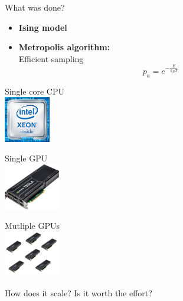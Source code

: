 \documentclass{beamer}
\begin{document}
\setcounter{framenumber}{0}

\begin{frame}{What was done?}
    \begin{itemize}
        \item \textbf{Ising model}
            \noindent \ising
        \item \textbf{Metropolis algorithm:}\\
            Efficient sampling
            \begin{equation*}
                p_a = e^{-\frac{E}{k_B T}}
            \end{equation*}
    \end{itemize} \pause
    \vspace{5mm}
    \begin{minipage}{0.2\paperwidth}
        Single core CPU\\
        \includegraphics[keepaspectratio=true, height=2cm]{images/intel_xeon.jpg}
    \end{minipage} \pause
    \hfill
    \begin{minipage}{0.2\paperwidth}
        Single GPU\\
        \includegraphics[keepaspectratio=true, height=2cm]{images/gpu_modified.png}
    \end{minipage} \pause
    \hfill
    \begin{minipage}{0.3\paperwidth}
        Mutliple GPUs\\
        \includegraphics[keepaspectratio=true, height=2cm]{images/multi_gpu.png}
    \end{minipage} \pause
\begin{highlightbox}
    How does it scale? Is it worth the effort?
\end{highlightbox}
\end{frame}
\end{document}
